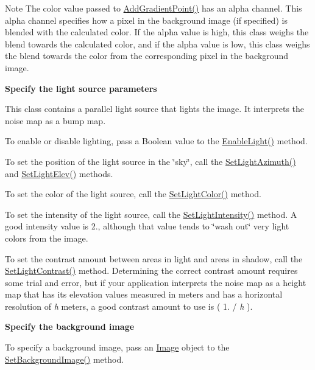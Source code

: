 \begin{DoxyNote}{Note}
The color value passed to \hyperlink{classnoise_1_1utils_1_1_renderer_image_a075cb17fcaf8e329f20e6fa9d1a7cb99}{Add\+Gradient\+Point()} has an alpha channel. This alpha channel specifies how a pixel in the background image (if specified) is blended with the calculated color. If the alpha value is high, this class weighs the blend towards the calculated color, and if the alpha value is low, this class weighs the blend towards the color from the corresponding pixel in the background image.
\end{DoxyNote}
{\bfseries Specify the light source parameters}

This class contains a parallel light source that lights the image. It interprets the noise map as a bump map.

To enable or disable lighting, pass a Boolean value to the \hyperlink{classnoise_1_1utils_1_1_renderer_image_a132794038f83055070281eadc54321ba}{Enable\+Light()} method.

To set the position of the light source in the \char`\"{}sky\char`\"{}, call the \hyperlink{classnoise_1_1utils_1_1_renderer_image_a3f60f115936df731eddca38bcc96b67c}{Set\+Light\+Azimuth()} and \hyperlink{classnoise_1_1utils_1_1_renderer_image_a6456ef5e27556480c71e3a6c899bff3b}{Set\+Light\+Elev()} methods.

To set the color of the light source, call the \hyperlink{classnoise_1_1utils_1_1_renderer_image_a015f4b32365e6f62285b9f741d122b8d}{Set\+Light\+Color()} method.

To set the intensity of the light source, call the \hyperlink{classnoise_1_1utils_1_1_renderer_image_ae4ca7c9d7b014a289f9f51a4c3365e78}{Set\+Light\+Intensity()} method. A good intensity value is 2., although that value tends to \char`\"{}wash out\char`\"{} very light colors from the image.

To set the contrast amount between areas in light and areas in shadow, call the \hyperlink{classnoise_1_1utils_1_1_renderer_image_a295ef7be9f61214533a661cb94e8820a}{Set\+Light\+Contrast()} method. Determining the correct contrast amount requires some trial and error, but if your application interprets the noise map as a height map that has its elevation values measured in meters and has a horizontal resolution of {\itshape h} meters, a good contrast amount to use is ( 1. / {\itshape h} ).

{\bfseries Specify the background image}

To specify a background image, pass an \hyperlink{classnoise_1_1utils_1_1_image}{Image} object to the \hyperlink{classnoise_1_1utils_1_1_renderer_image_a7807fd07a12617e404727944b7d42872}{Set\+Background\+Image()} method.


